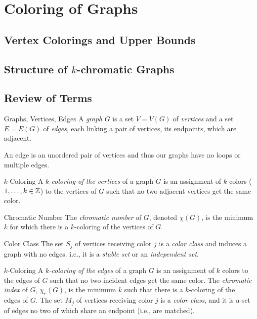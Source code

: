\section{Coloring of Graphs}
\subsection{Vertex Colorings and Upper Bounds}
\subsection{Structure of $k$-chromatic Graphs}
\subsection{Review of Terms}
\begin{df}{Graphs, Vertices, Edges}
	A \textit{graph} $G$ is a set $V=V(G)$ of \textit{vertices} and a set $E=E(G)$ of \textit{edges}, each linking a pair of vertices, its endpoints, which are adjacent. 	
\end{df}
\begin{rmk}
	An edge is an unordered pair of vertices and thus our graphs have no loops or multiple edges.	
\end{rmk}
\begin{df}{$k$-Coloring}
	A \textit{$k$-coloring of the vertices} of a graph $G$ is an assignment of $k$ colors ($1,\dots,k\in{\mathbb{Z}}$) to the vertices of $G$ such that no two adjacent vertices get the same color.	
\end{df}
\begin{df}{Chromatic Number}
	The \textit{chromatic number} of $G$, denoted $\chi(G)$, is the minimum $k$ for which there is a $k$-coloring of the vertices of $G$. 
\end{df}
\begin{df}{Color Class}
	The set $S_j$ of vertices receiving color $j$ is a \textit{color class} and induces a graph with no edges. i.e., it is a \textit{stable set} or an \textit{independent set}. 
\end{df}
\begin{df}{$k$-Coloring}
	A \textit{$k$-coloring of the edges} of a graph $G$ is an assignment of $k$ colors to the edges of $G$ such that no two incident edges get the same color. The \textit{chromatic index} of $G$, $\chi_e(G)$, is the minimum $k$ such that there is a $k$-coloring of the edges of $G$. The set $M_j$ of vertices receiving color $j$ is a \textit{color class}, and it is a set of edges no two of which share an endpoint (i.e., are matched).
\end{df}
